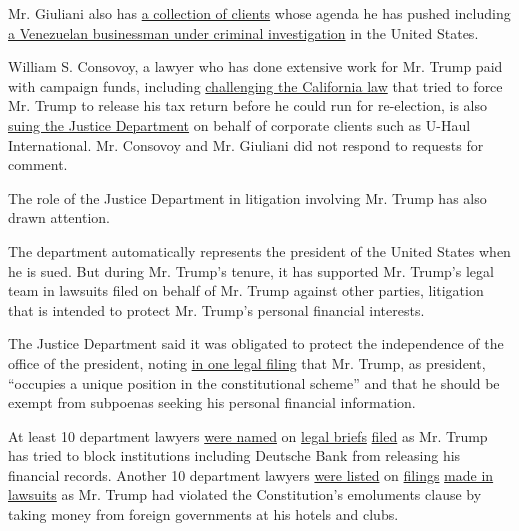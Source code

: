 Mr. Giuliani also has
\href{https://www.nytimes3xbfgragh.onion/2018/12/12/us/politics/giuliani-consulting-abroad.html}{a
collection of clients} whose agenda he has pushed including
\href{https://www.nytimes3xbfgragh.onion/2019/11/26/us/politics/giuliani-venezuelan-businessman.html}{a
Venezuelan businessman under criminal investigation} in the United
States.

William S. Consovoy, a lawyer who has done extensive work for Mr. Trump
paid with campaign funds, including
\href{http://cdn.cnn.com/cnn/2019/images/08/06/1.-.complaint.pdf}{challenging
the California law} that tried to force Mr. Trump to release his tax
return before he could run for re-election, is also
\href{https://www.pacermonitor.com/public/case/23450681/UHAUL_INTERNATIONAL,_INC_et_al_v_US_DEPARTMENT_OF_JUSTICE_et_al}{suing
the Justice Department} on behalf of corporate clients such as U-Haul
International. Mr. Consovoy and Mr. Giuliani did not respond to requests
for comment.

The role of the Justice Department in litigation involving Mr. Trump has
also drawn attention.

The department automatically represents the president of the United
States when he is sued. But during Mr. Trump's tenure, it has supported
Mr. Trump's legal team in lawsuits filed on behalf of Mr. Trump against
other parties, litigation that is intended to protect Mr. Trump's
personal financial interests.

The Justice Department said it was obligated to protect the independence
of the office of the president, noting
\href{https://www.supremecourt.gov/DocketPDF/19/19-715/130825/20200203173620062_19-715tsacUnitedStates.pdf}{in
one legal filing} that Mr. Trump, as president, ``occupies a unique
position in the constitutional scheme'' and that he should be exempt
from subpoenas seeking his personal financial information.

At least 10 department lawyers
\href{https://www.supremecourt.gov/DocketPDF/19/19-715/130825/20200203173620062_19-715tsacUnitedStates.pdf}{were
named} on
\href{https://www.supremecourt.gov/opinions/19pdf/19-635_o7jq.pdf}{legal
briefs}
\href{http://cdn.cnn.com/cnn/2019/images/08/19/courtdocument0819.pdf}{filed}
as Mr. Trump has tried to block institutions including Deutsche Bank
from releasing his financial records. Another 10 department lawyers
\href{https://s3.amazonaws.com/storage.citizensforethics.org/wp-content/uploads/2017/01/25152311/2018-5-29-128-Trump-Brief.pdf}{were
listed} on
\href{http://oag.dc.gov/sites/default/files/2018-03/Defendants-Motion-to-Dismiss.pdf}{filings}
\href{https://www.courtlistener.com/recap/gov.uscourts.dcd.187220.15.0.pdf}{made
in lawsuits} as Mr. Trump had violated the Constitution's emoluments
clause by taking money from foreign governments at his hotels and clubs.


